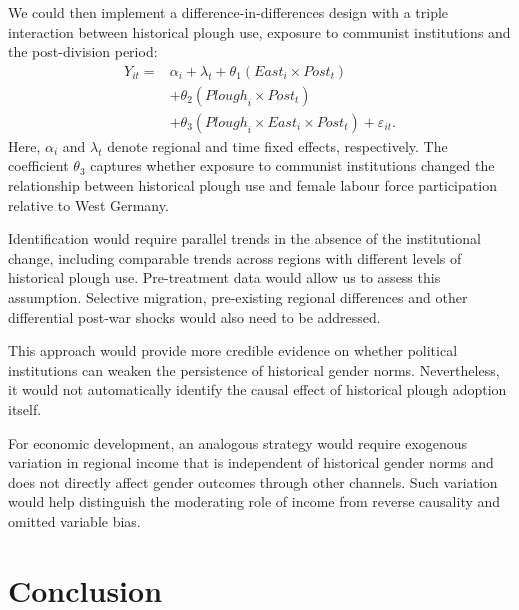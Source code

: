 \documentclass[12pt,a4paper]{article}
\begin{document}
We could then implement a difference-in-differences design with a triple interaction between historical plough use, exposure to communist institutions and the post-division period:
\begin{equation}
\begin{aligned}
    Y_{it} = {} & \alpha_i + \lambda_t
    + \theta_1 (\mathit{East}_i \times \mathit{Post}_t) \\
    & + \theta_2 (\mathit{Plough}_i \times \mathit{Post}_t) \\
    & + \theta_3 (\mathit{Plough}_i \times \mathit{East}_i \times \mathit{Post}_t)
    + \varepsilon_{it}.
\end{aligned}
\label{eq:ideal_strategy}
\end{equation}
Here, $\alpha_i$ and $\lambda_t$ denote regional and time fixed effects, respectively. The coefficient $\theta_3$ captures whether exposure to communist institutions changed the relationship between historical plough use and female labour force participation relative to West Germany.

Identification would require parallel trends in the absence of the institutional change, including comparable trends across regions with different levels of historical plough use. Pre-treatment data would allow us to assess this assumption. Selective migration, pre-existing regional differences and other differential post-war shocks would also need to be addressed.

This approach would provide more credible evidence on whether political institutions can weaken the persistence of historical gender norms. Nevertheless, it would not automatically identify the causal effect of historical plough adoption itself.

For economic development, an analogous strategy would require exogenous variation in regional income that is independent of historical gender norms and does not directly affect gender outcomes through other channels. Such variation would help distinguish the moderating role of income from reverse causality and omitted variable bias.


\section{Conclusion}

\end{document}
